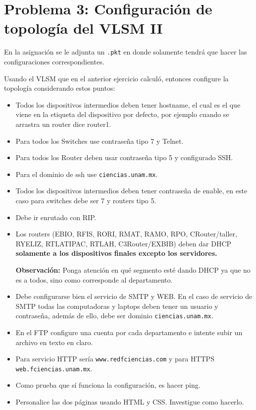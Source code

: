 \section{Problema 3: Configuración de topología del VLSM II}

\begin{tcolorbox}[enunciado]
En la asignación se le adjunta un \texttt{.pkt} en donde solamente tendrá que hacer las configuraciones correspondientes.

Usando el VLSM que en el anterior ejercicio calculó, entonces configure la topología considerando estos puntos:
\begin{itemize}
    \item Todos los dispositivos intermedios deben tener hostname, el cual es el que viene en la etiqueta del dispositivo por defecto, por ejemplo cuando se arrastra un router dice router1.
    \item Para todos los Switches use contraseña tipo 7 y Telnet.
    \item Para todos los Router deben usar contraseña tipo 5 y configurado SSH. 
    \item Para el dominio de ssh use \texttt{ciencias.unam.mx}.
    \item Todos los dispositivos intermedios deben tener contraseña de enable, en este caso para switches debe ser 7 y routers tipo 5. 
    \item Debe ir enrutado con RIP.
    \item Los routers (EBIO, RFIS, RORI, RMAT, RAMO, RPO, CRouter/taller, RYELIZ, RTLATIPAC, RTLAH, C3Router/EXBIB) deben dar DHCP \textbf{solamente a los dispositivos finales excepto los servidores.} 
    
    \textbf{Observación:} Ponga atención en qué segmento esté dando DHCP ya que no es a todos, sino como corresponde al departamento.
    \item Debe configurarse bien el servicio de SMTP y WEB. En el caso de servicio de SMTP todas las computadoras y laptops deben tener un usuario y contraseña, además de ello, debe ser dominio \texttt{ciencias.unam.mx}. 
    \item En el FTP configure una cuenta por cada departamento e intente subir un archivo en texto en claro.
    \item Para servicio HTTP sería \texttt{www.redfciencias.com} y para HTTPS \texttt{web.fciencias.unam.mx}.
    \item Como prueba que sí funciona la configuración, es hacer ping.
    \item Personalice las dos páginas usando HTML y CSS. Investigue como hacerlo.
\end{itemize}


\end{tcolorbox}
